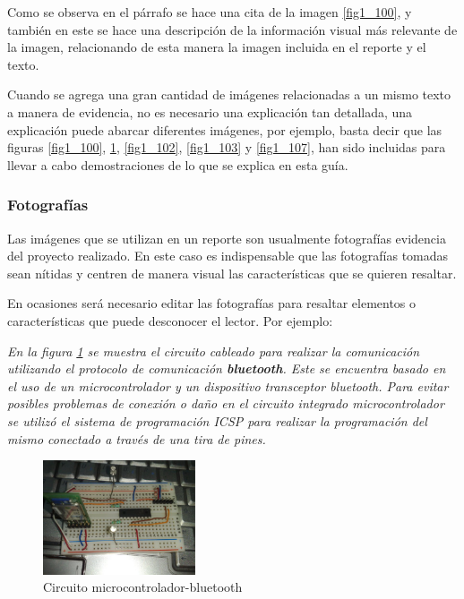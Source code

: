 Como se observa en el párrafo se hace una cita de la imagen \ref{fig1_100}, y también en este se hace una descripción de la información visual más relevante de la imagen, relacionando de esta manera la imagen incluida en el reporte y el texto.


Cuando se agrega una gran cantidad de imágenes relacionadas a un mismo texto a manera de evidencia, no es necesario una explicación tan detallada, una explicación puede abarcar diferentes imágenes, por ejemplo, basta decir que las figuras \ref{fig1_100}, \ref{fig1_101}, \ref{fig1_102}, \ref{fig1_103} y \ref{fig1_107}, han sido incluidas para llevar a cabo demostraciones de lo que se explica en esta guía.

\subsubsection{Fotografías}

Las imágenes que se utilizan en un reporte son usualmente fotografías evidencia del proyecto realizado. En este caso es indispensable que las fotografías tomadas sean nítidas y centren
de manera visual las características que se quieren resaltar.

En ocasiones será necesario editar las fotografías para resaltar elementos o características que puede desconocer el lector. Por ejemplo:

\emph{En la figura \ref{fig1_101} se muestra el circuito cableado para realizar la comunicación utilizando el protocolo de comunicación \textbf{bluetooth}. Este se encuentra basado en el uso de un microcontrolador y un dispositivo transceptor bluetooth. Para evitar posibles problemas de conexión o daño en el circuito integrado  microcontrolador se utilizó el sistema de programación ICSP para realizar la programación del mismo conectado a través de una tira de pines.}

\begin{figure}[!htbp]
        \centering
        \includegraphics[width=0.4\textwidth]{images/imagensinexplicar.eps}
        \caption{\footnotesize{Circuito microcontrolador-bluetooth}}
        \label{fig1_101}
\end{figure}

